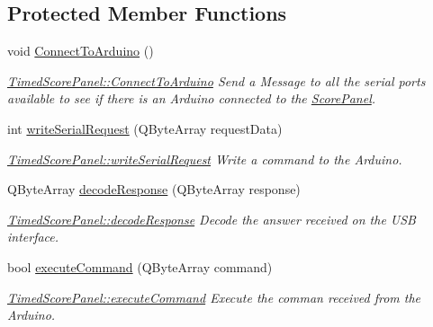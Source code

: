 \subsection*{Protected Member Functions}
\begin{DoxyCompactItemize}
\item 
\mbox{\label{classTimedScorePanel_a971b104a47767e9f5a2632ce6bbf9eb2}} 
void \mbox{\hyperlink{classTimedScorePanel_a971b104a47767e9f5a2632ce6bbf9eb2}{Connect\+To\+Arduino}} ()
\begin{DoxyCompactList}\small\item\em \mbox{\hyperlink{classTimedScorePanel_a971b104a47767e9f5a2632ce6bbf9eb2}{Timed\+Score\+Panel\+::\+Connect\+To\+Arduino}} Send a Message to all the serial ports available to see if there is an Arduino connected to the \mbox{\hyperlink{classScorePanel}{Score\+Panel}}. \end{DoxyCompactList}\item 
int \mbox{\hyperlink{classTimedScorePanel_a4e817b212121e6970b2af49c8e7c47ca}{write\+Serial\+Request}} (Q\+Byte\+Array request\+Data)
\begin{DoxyCompactList}\small\item\em \mbox{\hyperlink{classTimedScorePanel_a4e817b212121e6970b2af49c8e7c47ca}{Timed\+Score\+Panel\+::write\+Serial\+Request}} Write a command to the Arduino. \end{DoxyCompactList}\item 
Q\+Byte\+Array \mbox{\hyperlink{classTimedScorePanel_aa4af54da0ec58b24e4e36812c90de9b8}{decode\+Response}} (Q\+Byte\+Array response)
\begin{DoxyCompactList}\small\item\em \mbox{\hyperlink{classTimedScorePanel_aa4af54da0ec58b24e4e36812c90de9b8}{Timed\+Score\+Panel\+::decode\+Response}} Decode the answer received on the U\+SB interface. \end{DoxyCompactList}\item 
bool \mbox{\hyperlink{classTimedScorePanel_a0b1e7a7596b1e059571c65ce6046c343}{execute\+Command}} (Q\+Byte\+Array command)
\begin{DoxyCompactList}\small\item\em \mbox{\hyperlink{classTimedScorePanel_a0b1e7a7596b1e059571c65ce6046c343}{Timed\+Score\+Panel\+::execute\+Command}} Execute the comman received from the Arduino. \end{DoxyCompactList}\end{DoxyCompactItemize}
